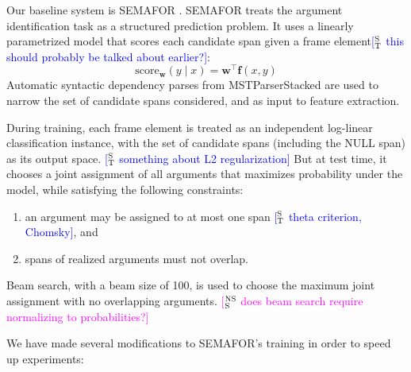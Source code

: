 \documentclass[11pt,a4paper]{article}
\newcommand{\ensuretext}[1]{#1}
\newcommand{\nssmarker}{\ensuretext{\textcolor{magenta}{\ensuremath{^{\textsc{NS}}_{\textsc{S}}}}}}
\newcommand{\stmarker}{\ensuretext{\textcolor{blue}{\ensuremath{^{\textsc{S}}_{\textsc{T}}}}}}
\newcommand{\arkcomment}[3]{\ensuretext{\textcolor{#3}{[#1 #2]}}}
\newcommand{\nss}[1]{\arkcomment{\nssmarker}{#1}{magenta}}
\newcommand{\st}[1]{\arkcomment{\stmarker}{#1}{blue}}
\newcommand{\term}[1]{\textbf{#1}} %
\begin{document}

Our baseline system is SEMAFOR \citep{das-14}.
SEMAFOR treats the argument identification task as a structured prediction problem.
It uses a linearly parametrized model that scores each candidate span given a frame element\st{this should probably be talked about earlier?}:
\begin{equation}
\text{score}_\mathbf{w}(y \mid x) = \mathbf{w}^\top \mathbf{f}(x, y)
\end{equation}
Automatic syntactic dependency parses from MSTParserStacked \citep{martins-08} are used to narrow the set of candidate spans considered, and as input to feature extraction.

During training, each frame element is treated as an independent log-linear classification instance, with the set of candidate spans (including the \textsc{NULL} span) as its output space.
\st{something about L2 regularization}
But at test time, it chooses a joint assignment of all arguments that maximizes probability under the model, while satisfying the following constraints:
\begin{enumerate}
  \item an argument may be assigned to at most one span \st{theta criterion, Chomsky}, and
  \item spans of realized arguments must not overlap.
\end{enumerate}
Beam search, with a beam size of 100, is used to choose the maximum joint assignment with no overlapping arguments.
\nss{does beam search require normalizing to probabilities?}

We have made several modifications to SEMAFOR's training in order to speed up experiments:
\end{document}

